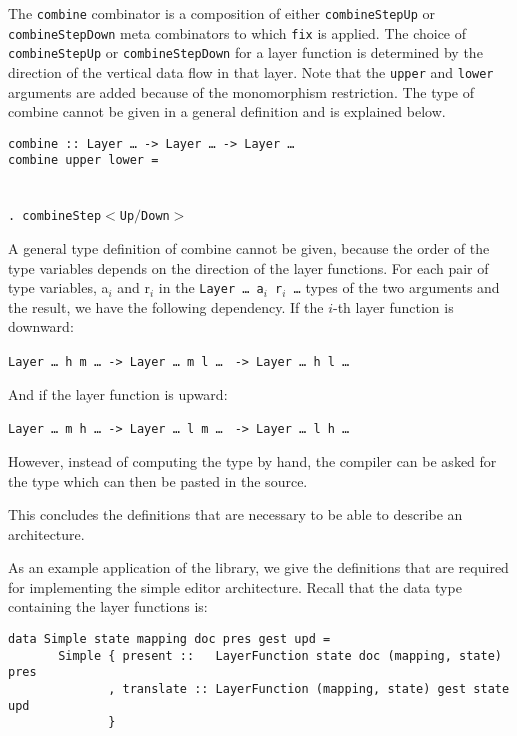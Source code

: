 \par The \texttt{combine} combinator is a composition of either
        \texttt{combineStepUp} or \texttt{combineStepDown} meta combinators to which
        \texttt{fix} is applied. The choice of \texttt{combineStepUp} or
        \texttt{combineStepDown} for a layer function is determined by the direction of
        the vertical data flow in that layer. Note that the \texttt{upper} and
        \texttt{lower} arguments are added because of the monomorphism restriction. The
        type of combine cannot be given in a general definition and is explained
        below.\begin{tabbing}
{\tt combine}\verb| :: |{\tt Layer \dots}\verb| -> |{\tt Layer \dots}\verb| -> |{\tt Layer \dots }\\
{\tt co}\={\tt mbin}\={\tt e upper lower = }\\
\\
\>\>{\tt \dots}\\ 
\>\>\verb|. combine|{\tt Step$<$Up$/$Down$>$}\\
\>
\end{tabbing}
\par A general type definition of combine cannot be given, because the
        order of the type variables depends on the direction of the layer functions.
        For each pair of type variables, a$_i$ and r$_i$ in the \texttt{Layer \dots~a$_i$
        r$_i$ \dots} types of the two arguments and the result, we have the
        following dependency. If the $i$-th layer function is downward:\par
{\tt Layer \dots~h m \dots}\verb| -> |{\tt Layer \dots~m l \dots}
                \verb| -> |{\tt Layer \dots~h l \dots}
\par And if the layer function is upward:\par
{\tt Layer \dots~m h \dots}\verb| -> |{\tt Layer \dots~l m \dots}
                \verb| -> |{\tt Layer \dots~l h \dots}
\par However, instead of computing the type by hand, the compiler can be
        asked for the type which can then be pasted in the source.
\par This concludes the definitions that are necessary to be able to
        describe an architecture. 
\par {} As an example application of the
        library, we give the definitions that are required for implementing the simple
        editor architecture. Recall that the data type containing the layer functions
        is:\begin{small}\begin{verbatim}data Simple state mapping doc pres gest upd =
       Simple { present ::   LayerFunction state doc (mapping, state) pres
              , translate :: LayerFunction (mapping, state) gest state upd
              }\end{verbatim}\end{small}

